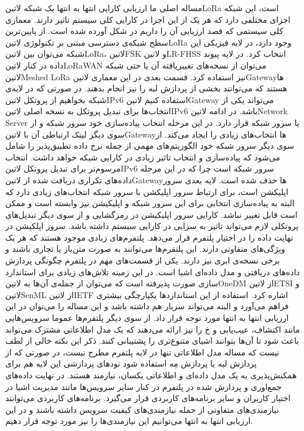 
مساله اصلی ما ارزیابی کارایی انتها به انتها یک شبکه ‌لاتین{LoRa} است، این شبکه اجزای مختلفی دارد که هر یک از این اجزا در کارایی کلی سیستم تاثیر دارند.
معماری کلی سیستمی که قصد ارزیابی آن را داریم در شکل  آورده شده است.
از پایین‌ترین سطح شبکه‌ی دسترسی مبتنی بر تکنولوژی ‌لاتین{LoRa} وجود دارد، در لایه فیزیکی این شبکه می‌توان بین ‌لاتین{LoRa}، ‌لاتین{FSK}
و ‌لاتین{LR-FHSS} انتخاب کرد. در لایه پیوند داده در کنار ‌لاتین{LoRaWAN} می‌توان از نسخه‌های تغییریافته آن یا حتی شبکه ‌لاتین{Meshed LoRa} نیز استفاده کرد.
قسمت بعدی در این معماری ‌لاتین{Gateway}ها هستند که می‌توانند بخشی از پردازش لبه را نیز انجام بدهند. در صورتی که در لایه‌ی شبکه بخواهیم از پروتکل ‌لاتین{IPv6} استفاده کنیم
‌لاتین{Gateway} می‌تواند یکی از انتخاب‌ها برای تبدیل پروتکل به نسخه اصلی ‌لاتین{IPv6} باشد.
در ادامه ‌لاتین{Network Server} یا سرور شبکه قرار دارد. در این مرحله انتخاب پیاده‌سازی خود سرور شبکه و از سوی دیگر لینک ارتباطی آن با
‌لاتین{Gateway}ها انتخاب‌های زیادی را ایجاد می‌کند. از سوی دیگر سرور شبکه خود الگوریتم‌های مهمی از جمله نرخ داده تطبیق‌پذیر را شامل می‌شود
که پیاده‌سازی و انتخاب تاثیر زیادی در کارایی شبکه خواهد داشت. انتخاب مرسوم‌تر برای تبدیل پروتکل ‌لاتین{IPv6} سرور شبکه است چرا که در این مرحله داده‌های تکراری دریافت شده از
‌لاتین{Gateway}ها حذف شده است.
لایه بعدی سرور اپلیکشن است، برای ارتباط سرور اپلیکشن با سرور شبکه انتخاب‌های زیادی دارد که البته به پیاده‌سازی انتخابی برای این سرور شبکه و اپلیکیشن نیز وابسته است
و ممکن است قابل تغییر نباشد. کارایی سرور اپلیکیشن در رمزگشایی و از سوی دیگر تبدیل‌های پروتکلی لازم می‌تواند تاثیر به سزایی در کارایی سیستم داشته باشد.
سرور اپلکیشن در نهایت داده را در اختیار پلتفرم قرار می‌دهد. پلتفرم‌های زیادی موجود هستند که هر یک ویژگی‌های متفاوتی دارند.
این پلتفرم‌ها می‌توانند به صورت متن‌باز یا تجاری باشند و برخی نسخه‌ی ابری نیز دارند.
یکی از قسمت‌های مهم
در پلتفرم چگونگی پردازش داده‌های دریافتی و مدل داده‌ای اشیا است. در این زمینه تلاش‌های زیادی برای استاندارد سازی صورت پذیرفته است که می‌توان از
جمله‌ی آن‌ها به ‌لاتین{OneDM} از ‌لاتین{ETSI} و ‌لاتین{SenML} از ‌لاتین{IETF} اشاره کرد. استفاده از این استانداردها یکپارچگی
بیشتری فراهم می‌آورد و البته می‌تواند سربار هم داشته باشد و این مساله را می‌توان در این ارزیابی انتها به انتها مورد توجه قرار داد.
از سوی دیگر پلتفرم‌ها عموما سرویس‌هایی مانند اکتشاف، عیب‌یابی و ‌خ را نیز ارائه می‌دهند که یک مدل اطلاعاتی مشترک می‌تواند باعث شود تا آن‌ها
بتوانند اشیای متنوع‌تری را پشتیبانی کنند.
ذکر این نکته خالی از لطف نیست که مساله مدل اطلاعاتی تنها در لایه پلتفرم مطرح نیست، در صورتی که از پردازش لبه یا پردازش مِه استفاده شود نودهای پردازشی این لایه
هم برای همکنش‌پذیری به یک مدل داده‌ای و اطلاعاتی یکسان، نیازمند هستند.
در نهایت داده‌های جمع‌اوری و پردازش شده در پلتفرم در کنار سایر سرویس‌ها مانند مدیریت اشیا در اختیار کاربران و سایر برنامه‌های کاربردی قرار می‌گیرد.
برنامه‌های کاربردی می‌توانند نیازمندی‌های متفاوتی از جمله نیازمندی‌های کیفیت سرویس داشته باشند و در این ارزیابی انتها به انتها می‌توانیم این نیازمندی‌ها را
نیز مورد توجه قرار دهیم.

